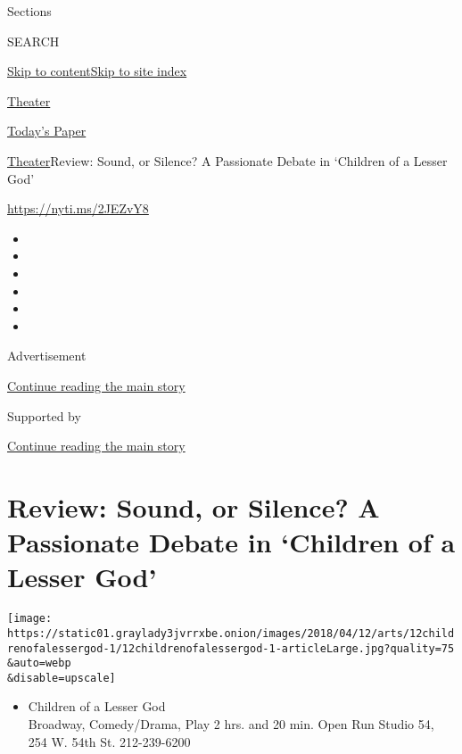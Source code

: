 Sections

SEARCH

\protect\hyperlink{site-content}{Skip to
content}\protect\hyperlink{site-index}{Skip to site index}

\href{https://www.nytimes3xbfgragh.onion/section/theater}{Theater}

\href{https://myaccount.nytimes3xbfgragh.onion/auth/login?response_type=cookie\&client_id=vi}{}

\href{https://www.nytimes3xbfgragh.onion/section/todayspaper}{Today's
Paper}

\href{/section/theater}{Theater}\textbar{}Review: Sound, or Silence? A
Passionate Debate in `Children of a Lesser God'

\url{https://nyti.ms/2JEZvY8}

\begin{itemize}
\item
\item
\item
\item
\item
\item
\end{itemize}

Advertisement

\protect\hyperlink{after-top}{Continue reading the main story}

Supported by

\protect\hyperlink{after-sponsor}{Continue reading the main story}

\hypertarget{review-sound-or-silence-a-passionate-debate-in-children-of-a-lesser-god}{%
\section{Review: Sound, or Silence? A Passionate Debate in `Children of
a Lesser
God'}\label{review-sound-or-silence-a-passionate-debate-in-children-of-a-lesser-god}}

\texttt{[image: https://static01.graylady3jvrrxbe.onion/images/2018/04/12/arts/12childrenofalessergod-1/12childrenofalessergod-1-articleLarge.jpg?quality=75\\\&auto=webp\\\&disable=upscale]}

\begin{itemize}
\tightlist
\item
  Children of a Lesser God\\
  Broadway, Comedy/Drama, Play 2 hrs. and 20 min. Open Run Studio 54,
  254 W. 54th St. 212-239-6200
\end{itemize}

